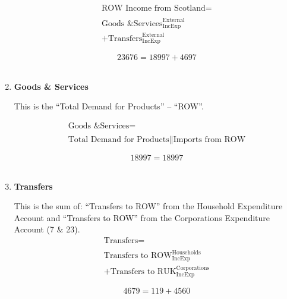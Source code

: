 \begin{enumerate}
\begin{equation}
\begin{split}
\text{ROW Income from Scotland} =  \\ \\
\text{Goods \& Services}^\text{External}_\text{IncExp}\\
+\text{Transfers}^\text{External}_\text{IncExp}
\end{split} \label{eq:2.5.58}
\end{equation}

\begin{equation} \nonumber
23676 = 18997+4697
\end{equation}\\


\item \textbf {Goods \& Services}

This is the ``Total Demand for Products'' – ``ROW''. \cite{ScotGov2013a}

\begin{equation}
\begin{split}
\text{Goods \& Services} =  \\ \\
\text{Total Demand for Products}\|\text{Imports from ROW}
\end{split} \label{eq:2.5.59}
\end{equation}

\begin{equation} \nonumber
18997 = 18997
\end{equation}\\


\item \textbf {Transfers}

This is the sum of: ``Transfers to ROW'' from the Household Expenditure Account and ``Transfers to ROW'' from the Corporations Expenditure Account (7 \& 23).\\

\begin{equation}
\begin{split}
\text{Transfers} =  \\ \\
\text{Transfers to ROW}^\text{Households}_\text{IncExp}\\
+\text{Transfers to RUK}^\text{Corporations}_\text{IncExp}
\end{split} \label{eq:2.5.60}
\end{equation}

\begin{equation} \nonumber
4679 = 119+4560
\end{equation}\\



\end{enumerate}
